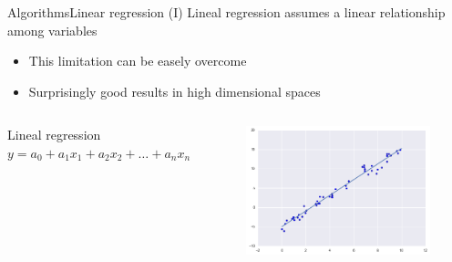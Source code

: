 \documentclass[10pt,compress]{beamer} %
\begin{document}
\begin{frame}{Algorithms}{Linear regression (I)}
     Lineal regression assumes a linear relationship among variables
	\begin{itemize}
		\item This limitation can be easely overcome
		\item Surprisingly good results in high dimensional spaces
	\end{itemize}

    \begin{columns}
        \begin{block}{Lineal regression}
            $y = a_0 + a_1 x_1  + a_2 x_2 + \dots + a_n x_n$
        \end{block}

		\begin{figure}
	        \includegraphics[width=\textwidth]{figs/regression.png}
		\end{figure}
    \end{columns}

\end{frame}


\end{document}
